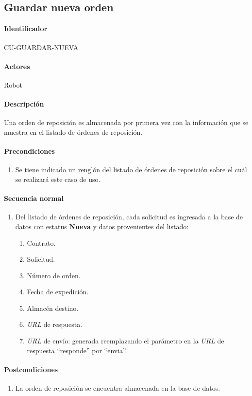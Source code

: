 \subsection{Guardar nueva orden}\label{cu-guardar-nueva}
\paragraph{Identificador}
CU-GUARDAR-NUEVA
\paragraph{Actores}
Robot
\paragraph{Descripción}
Una orden de reposición es almacenada por primera vez con la información que se muestra en el listado de órdenes de reposición.
\paragraph{Precondiciones}
\begin{enumerate}
  \item Se tiene indicado un renglón del listado de órdenes de reposición sobre el cuál se realizará este caso de uso.
\end{enumerate}
\paragraph{Secuencia normal}
\begin{enumerate}
  \item Del listado de órdenes de reposición, cada solicitud es ingresada a la base de datos con estatus \textbf{Nueva} y datos provenientes del listado:
  \begin{enumerate}
    \item Contrato.
    \item Solicitud.
    \item Número de orden.
    \item Fecha de expedición.
    \item Almacén destino.
    \item \textit{URL} de respuesta.
    \item \textit{URL} de envío: generada reemplazando el parámetro en la \textit{URL} de respuesta ``responde'' por ``envia''.
  \end{enumerate}
\end{enumerate}
\paragraph{Postcondiciones}
\begin{enumerate}
  \item La orden de reposición se encuentra almacenada en la base de datos.
\end{enumerate}
